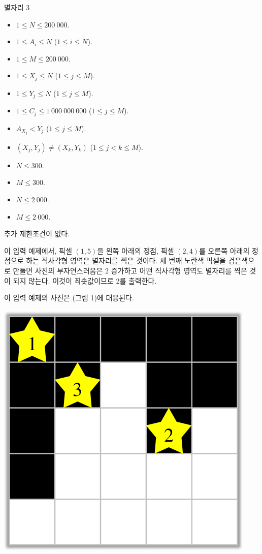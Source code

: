 \begin{problem}{별자리 3}
\Constraints

\begin{itemize}
	\item $1 \le N \le 200\ 000$.
	\item $1 \le A_i \le N$ ($1 \le i \le N$).
	\item $1 \le M \le 200\ 000$.
	\item $1 \le X_j \le N$ ($1 \le j \le M$).
	\item $1 \le Y_j \le N$ ($1 \le j \le M$).
	\item $1 \le C_j \le 1\ 000\ 000\ 000$ ($1 \le j \le M$).
	\item $A_{X_j} < Y_j$ ($1 \le j \le M$).	
	\item $(X_j, Y_j) \ne (X_k, Y_k)$ ($1 \le j < k \le M$).
\end{itemize}


\begin{itemize}
	\item $N \le 300$.
	\item $M \le 300$.
\end{itemize}


\begin{itemize}
	\item $N \le 2\ 000$.
	\item $M \le 2\ 000$.
\end{itemize}


추가 제한조건이 없다.

\Examples

\begin{example}
\end{example}

이 입력 예제에서, 픽셀 $(1, 5)$을 왼쪽 아래의 정점, 픽셀 $(2, 4)$를 오른쪽 아래의 정점으로 하는 직사각형 영역은 별자리를 찍은 것이다. 세 번째 노란색 픽셀을 검은색으로 만들면 사진의 부자연스러움은 2 증가하고 어떤 직사각형 영역도 별자리를 찍은 것이 되지 않는다. 이것이 최솟값이므로 2를 출력한다.

이 입력 예제의 사진은 (그림 1)에 대응된다.

\begin{center}
\includegraphics[width=0.3\linewidth]{img1.png}


\end{center}
\end{problem}
